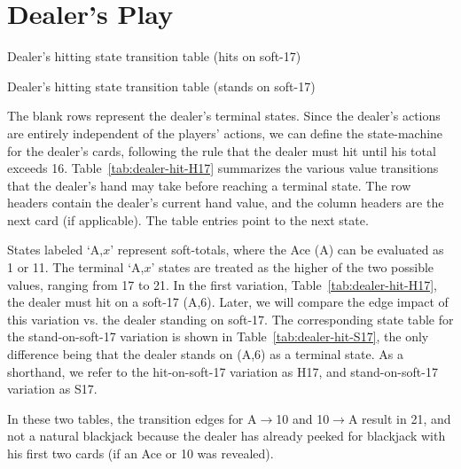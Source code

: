 \section{Dealer's Play}
\label{sec:rules:dealer-play}

\begin{table}[ht!]
\caption{Dealer's hitting state transition table (hits on soft-17)}
\begin{center}

\end{center}
\label{tab:dealer-hit-H17}
\end{table}

\begin{table}[ht!]
\caption{Dealer's hitting state transition table (stands on soft-17)}
\begin{center}

\end{center}
\label{tab:dealer-hit-S17}
\end{table}

The blank rows represent the dealer's terminal states.
Since the dealer's actions are entirely independent of 
the players' actions, we can define the state-machine
for the dealer's cards, following the rule that the dealer
must hit until his total exceeds 16.
Table~\ref{tab:dealer-hit-H17} summarizes the various
value transitions that the dealer's hand may take
before reaching a terminal state.
The row headers contain the dealer's current hand value, 
and the column headers are the next card (if applicable).
The table entries point to the next state.

States labeled `A,$x$' represent soft-totals, where the Ace (A)
can be evaluated as 1 or 11.  
The terminal `A,$x$' states are treated as the higher of the 
two possible values, ranging from 17 to 21.  
In the first variation, Table~\ref{tab:dealer-hit-H17}, 
the dealer must hit on a soft-17 (A,6).
Later, we will compare the edge impact of this variation
vs. the dealer standing on soft-17.
The corresponding state table for the stand-on-soft-17 variation
is shown in Table~\ref{tab:dealer-hit-S17}, 
the only difference being that the dealer stands on (A,6) 
as a terminal state.
As a shorthand, we refer to the hit-on-soft-17 variation as H17, 
and stand-on-soft-17 variation as S17.

In these two tables, the transition edges for A$\rightarrow$10
and 10$\rightarrow$A result in 21, and not a natural blackjack
because the dealer has already peeked for blackjack
with his first two cards (if an Ace or 10 was revealed).

